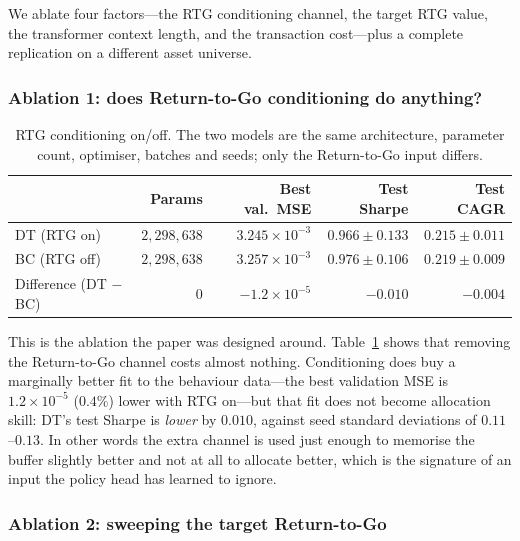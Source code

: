 \documentclass[11pt]{article}
\begin{document}
We ablate four factors---the RTG conditioning channel, the target RTG value, the transformer
context length, and the transaction cost---plus a complete replication on a different asset
universe.

\subsubsection{Ablation 1: does Return-to-Go conditioning do anything?}

\begin{table}[h]
\centering
\caption{RTG conditioning on/off. The two models are the same architecture, parameter count,
optimiser, batches and seeds; only the Return-to-Go input differs.}
\label{tab:rtg-onoff}
\small
\begin{tabular}{lrrrr}
\toprule
 & Params & Best val.\ MSE & Test Sharpe & Test CAGR \\
\midrule
DT (RTG on)  & $2{,}298{,}638$ & $3.245\times10^{-3}$ & $0.966 \pm 0.133$ & $0.215 \pm 0.011$ \\
BC (RTG off) & $2{,}298{,}638$ & $3.257\times10^{-3}$ & $0.976 \pm 0.106$ & $0.219 \pm 0.009$ \\
\midrule
Difference (DT $-$ BC) & $0$ & $-1.2\times10^{-5}$ & $-0.010$ & $-0.004$ \\
\bottomrule
\end{tabular}
\end{table}

This is the ablation the paper was designed around. Table~\ref{tab:rtg-onoff} shows that
removing the Return-to-Go channel costs almost nothing. Conditioning does buy a marginally
better fit to the behaviour data---the best validation MSE is $1.2\times10^{-5}$ ($0.4\%$)
lower with RTG on---but that fit does not become allocation skill: DT's test Sharpe is
\emph{lower} by $0.010$, against seed standard deviations of $0.11$--$0.13$. In other words the
extra channel is used just enough to memorise the buffer slightly better and not at all to
allocate better, which is the signature of an input the policy head has learned to ignore.

\subsubsection{Ablation 2: sweeping the target Return-to-Go}
\end{document}

